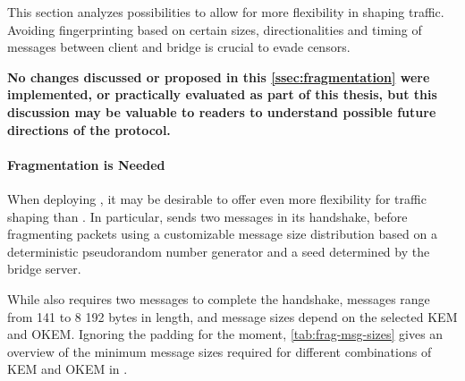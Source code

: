 This section analyzes possibilities to allow for more flexibility in shaping \drivel{} traffic. Avoiding fingerprinting based on certain sizes, directionalities and timing of messages between client and bridge is crucial to evade censors.

\textbf{No changes discussed or proposed in this \cref{ssec:fragmentation} were implemented, or practically evaluated as part of this thesis, but this discussion may be valuable to readers to understand possible future directions of the protocol.}

\paragraph{Fragmentation is Needed}
When deploying \drivel{}, it may be desirable to offer even more flexibility for traffic shaping than \obfsfour{}. In particular, \obfsfour{} sends two messages in its handshake, before fragmenting packets using a customizable message size distribution based on a deterministic pseudorandom number generator and a seed determined by the bridge server.

While \drivel{} also requires two messages to complete the handshake, \obfsfour{} messages range from 141 to 8 192 bytes in length, and \drivel{} message sizes depend on the selected KEM and OKEM. Ignoring the padding for the moment, \cref{tab:frag-msg-sizes} gives an overview of the minimum message sizes required for different combinations of KEM and OKEM in \drivel{}.


